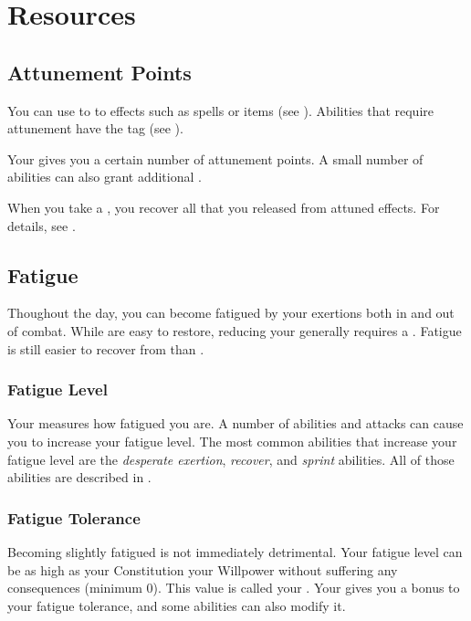 \section{Resources}\label{Resources}

    \subsection{Attunement Points}\label{Attunement Points}
        You can use  to  to effects such as spells or items (see ).
        Abilities that require attunement have the  tag (see ).

        Your  gives you a certain number of attunement points.
        A small number of abilities can also grant additional .

        When you take a , you recover all  that you released from attuned effects.
        For details, see .

    \subsection{Fatigue}\label{Fatigue}
        Thoughout the day, you can become fatigued by your exertions both in and out of combat.
        While  are easy to restore, reducing your  generally requires a .
        Fatigue is still easier to recover from than .

        \subsubsection{Fatigue Level}\label{Fatigue Level}
            Your  measures how fatigued you are.
            A number of abilities and attacks can cause you to increase your fatigue level.
            The most common abilities that increase your fatigue level are the \textit{desperate exertion}, \textit{recover}, and \textit{sprint} abilities.
            All of those abilities are described in .

            \subsubsection{Fatigue Tolerance}\label{Fatigue Tolerance}
                Becoming slightly fatigued is not immediately detrimental.
                Your fatigue level can be as high as your Constitution \add your Willpower without suffering any consequences (minimum 0).
                This value is called your .
                Your  gives you a bonus to your fatigue tolerance, and some abilities can also modify it.

